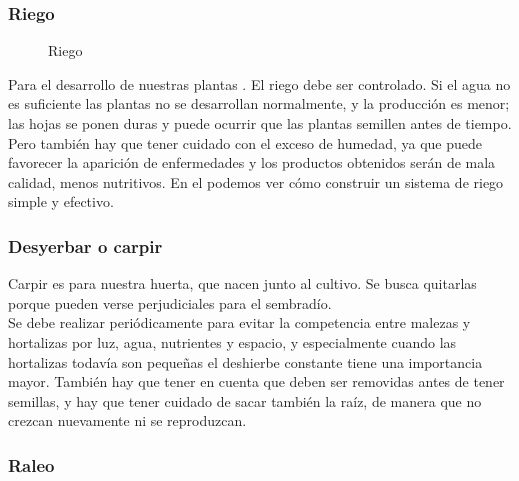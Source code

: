 \documentclass[../main.tex]{subfiles}
\begin{document}
\subsubsection{Riego}

\begin{wrapfigure}[20]{o}[0cm]{0.45\textwidth}
    \centering
    \caption*{\color{CompostGreen!50!black}Riego}
    \label{riego1}
\end{wrapfigure}

Para el desarrollo de nuestras plantas . El riego debe ser controlado. Si el agua no es suficiente las plantas no se desarrollan normalmente, y la producción es menor; las hojas se ponen duras y puede ocurrir que las plantas semillen antes de tiempo. Pero también hay que tener cuidado con el exceso de humedad, ya que puede favorecer la aparición de enfermedades y los productos obtenidos serán de mala calidad, menos nutritivos. En el  podemos ver cómo construir un sistema de riego simple y efectivo.


\subsubsection{Desyerbar o carpir}

Carpir es  para nuestra huerta, que nacen junto al cultivo. Se busca quitarlas porque pueden verse perjudiciales para el sembradío. \\

Se debe realizar periódicamente para evitar la competencia entre malezas y hortalizas por luz, agua, nutrientes y espacio, y especialmente cuando las hortalizas todavía son pequeñas el deshierbe constante tiene una importancia mayor. También hay que tener en cuenta que deben ser removidas antes de tener semillas, y hay que tener cuidado de sacar también la raíz, de manera que no crezcan nuevamente ni se reproduzcan.

\subsubsection{Raleo}
\end{document}
